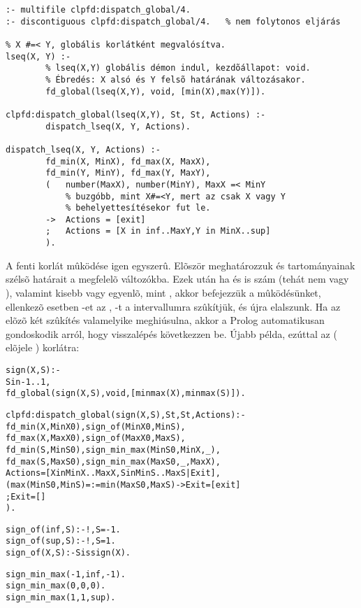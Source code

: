 \begin{verbatim}
:- multifile clpfd:dispatch_global/4.
:- discontiguous clpfd:dispatch_global/4.   % nem folytonos eljárás

% X #=< Y, globális korlátként megvalósítva.
lseq(X, Y) :-
        % lseq(X,Y) globális démon indul, kezdõállapot: void.
        % Ébredés: X alsó és Y felsõ határának változásakor.
        fd_global(lseq(X,Y), void, [min(X),max(Y)]).

clpfd:dispatch_global(lseq(X,Y), St, St, Actions) :-
        dispatch_lseq(X, Y, Actions).

dispatch_lseq(X, Y, Actions) :-
        fd_min(X, MinX), fd_max(X, MaxX),
        fd_min(Y, MinY), fd_max(Y, MaxY),
        (   number(MaxX), number(MinY), MaxX =< MinY
            % buzgóbb, mint X#=<Y, mert az csak X vagy Y
            % behelyettesítésekor fut le.
        ->  Actions = [exit]
        ;   Actions = [X in inf..MaxY,Y in MinX..sup]
        ).
\end{verbatim}

A fenti korlát mûködése igen egyszerû. Elõször meghatározzuk  és  tartományainak
szélsõ határait a megfelelõ változókba. Ezek után ha  és  is szám
(tehát nem  vagy ), valamint  kisebb vagy egyenlõ, mint ,
akkor befejezzük a mûködésünket, ellenkezõ esetben -et az , -t
a  intervallumra szûkítjük, és újra elalszunk. Ha az elõzõ két szûkítés
valamelyike meghiúsulna, akkor a Prolog automatikusan gondoskodik arról, hogy visszalépés
következzen be.
\br
Újabb példa, ezúttal az  ( elõjele ) korlátra:

\begin{alltt}
% X elõjele S, globális korlátként megvalósítva.
sign(X, S) :-
        S in -1..1,
        fd_global(sign(X,S), void, [minmax(X),minmax(S)]).
        % Ébredés: X és S alsó és felsõ határának változásakor.

clpfd:dispatch_global(sign(X,S), St, St, Actions) :-
        fd_min(X, MinX0), sign_of(MinX0, MinS),
        fd_max(X, MaxX0), sign_of(MaxX0, MaxS),
        fd_min(S, MinS0), sign_min_max(MinS0, MinX, _),
        fd_max(S, MaxS0), sign_min_max(MaxS0, _, MaxX),
        Actions = [X in MinX..MaxX, S in MinS..MaxS|Exit],
        (   max(MinS0,MinS)=:=min(MaxS0,MaxS) -> Exit = [exit]
        ;   Exit = []
        ).

% sign_of(X, S): X egész vagy végtelen érték elõjele S
sign_of(inf, S) :- !, S = -1.
sign_of(sup, S) :- !, S = 1.
sign_of(X, S) :- S is sign(X).

% sign_min_max(S, Min, Max): \(sign(x)=\cd{S} \Leftrightarrow x \in \cd{Min..Max}\)
sign_min_max(-1, inf, -1).
sign_min_max(0, 0, 0).
sign_min_max(1, 1, sup).
\end{alltt}

